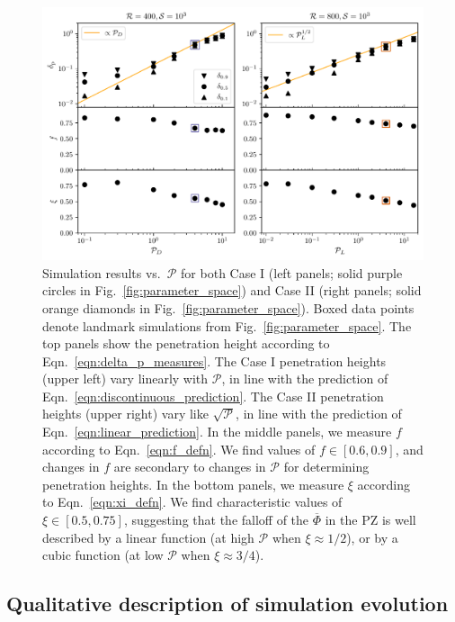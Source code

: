 \documentclass[twocolumn, linenumbers]{aastex631}
\newcommand{\mP}{\ensuremath{\mathcal{P}}}
\renewcommand{\bar}[1]{\overline{#1}}
\begin{document}
\begin{figure}[t]
\centering
\includegraphics[width=\textwidth]{parameters_vs_p.pdf}
\caption{
Simulation results vs.~$\mP$ for both Case I (left panels; solid purple circles in Fig.~\ref{fig:parameter_space}) and Case II (right panels; solid orange diamonds in Fig.~\ref{fig:parameter_space}).
Boxed data points denote landmark simulations from Fig.~\ref{fig:parameter_space}.
The top panels show the penetration height according to Eqn.~\ref{eqn:delta_p_measures}.
The Case I penetration heights (upper left) vary linearly with $\mP$, in line with the prediction of Eqn.~\ref{eqn:discontinuous_prediction}.
The Case II penetration heights (upper right) vary like $\sqrt{\mP}$, in line with the prediction of Eqn.~\ref{eqn:linear_prediction}.
In the middle panels, we measure $f$ according to Eqn.~\ref{eqn:f_defn}.
We find values of $f \in [0.6, 0.9]$, and changes in $f$ are secondary to changes in $\mP$ for determining penetration heights.
In the bottom panels, we measure $\xi$ according to Eqn.~\ref{eqn:xi_defn}.
We find characteristic values of $\xi \in [0.5, 0.75]$, suggesting that the falloff of the $\bar{\Phi}$ in the PZ is well described by a linear function (at high $\mP$ when $\xi \approx 1/2$), or by a cubic function (at low $\mP$ when $\xi \approx 3/4$).
\label{fig:parameters_vs_p}
}
\end{figure}


\subsection{Qualitative description of simulation evolution}
\end{document}
